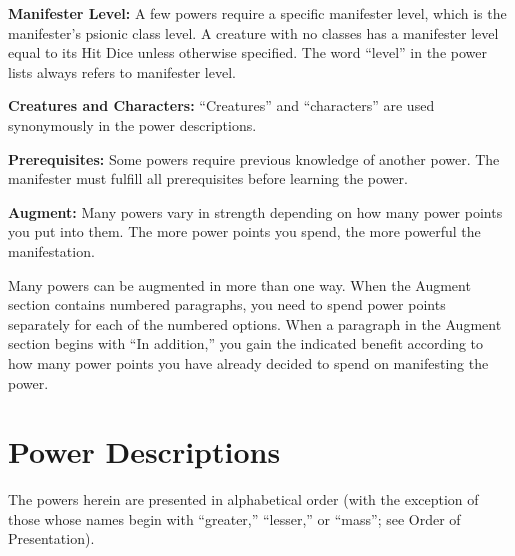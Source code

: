 \textbf{Manifester Level:} A few powers require a specific manifester level, which is the manifester's psionic class level. A creature with no classes has a manifester level equal to its Hit Dice unless otherwise specified. The word ``level'' in the power lists always refers to manifester level.

\textbf{Creatures and Characters:} ``Creatures'' and ``characters'' are used synonymously in the power descriptions.

\textbf{Prerequisites:} Some powers require previous knowledge of another power. The manifester must fulfill all prerequisites before learning the power.

\textbf{Augment:} Many powers vary in strength depending on how many power points you put into them. The more power points you spend, the more powerful the manifestation. %

Many powers can be augmented in more than one way. When the Augment section contains numbered paragraphs, you need to spend power points separately for each of the numbered options. When a paragraph in the Augment section begins with ``In addition,'' you gain the indicated benefit according to how many power points you have already decided to spend on manifesting the power.

% 
% 
% 




\clearpage
\section{Power Descriptions}
The powers herein are presented in alphabetical order (with the exception of those whose names begin with ``greater,'' ``lesser,'' or ``mass''; see Order of Presentation).


